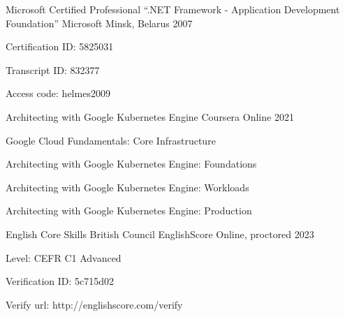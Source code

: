 

\begin{cventries}

  \cventry
   {Microsoft Certified Professional “.NET Framework - Application Development Foundation”} %
   {Microsoft} %
   {Minsk, Belarus} %
   {2007} %
   {
     \begin{cvitems} %
       \item {Certification ID: 5825031}
       \item {Transcript ID: 832377}
       \item {Access code: helmes2009}
     \end{cvitems}
   }

  \cventry
   {Architecting with Google Kubernetes Engine} %
   {Coursera} %
   {Online} %
   {2021} %
   {
     \begin{cvitems} %
       \item {Google Cloud Fundamentals: Core Infrastructure}
       \item {Architecting with Google Kubernetes Engine: Foundations}
       \item {Architecting with Google Kubernetes Engine: Workloads}
       \item {Architecting with Google Kubernetes Engine: Production}
     \end{cvitems}
   }

  \cventry
   {English Core Skills} %
   {British Council EnglishScore} %
   {Online, proctored} %
   {2023} %
   {
     \begin{cvitems} %
       \item {Level: CEFR C1 Advanced}
       \item {Verification ID: 5c715d02}
       \item {Verify url: http://englishscore.com/verify}
     \end{cvitems}
   }

\end{cventries}
